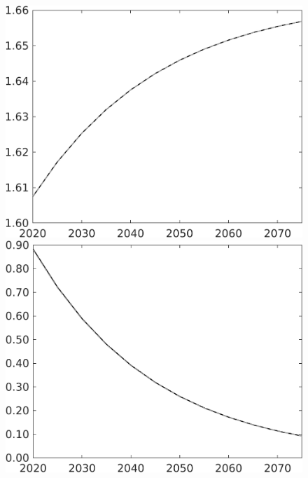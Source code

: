 \documentclass[12pt]{article}
\begin{document}
\begin{figure}[h!!]
\begin{minipage}[]{0.32\textwidth}
	\end{minipage}	
	\begin{minipage}[]{0.32\textwidth}
		\includegraphics[width=1\textwidth]{../../codding_model/own_basedOnFried/optimalPol_010922_revision/figures/all_13Sept22/CompTaul_Equlab_LFBAU_Reg0_pn_spillover0_nsk0_xgr1_knspil1_sep1_countec0_GovRev0_etaa0.79_lgd0.png}
	\end{minipage}	
	\begin{minipage}[]{0.32\textwidth}
		\includegraphics[width=1\textwidth]{../../codding_model/own_basedOnFried/optimalPol_010922_revision/figures/all_13Sept22/CompTaul_Equlab_LFBAU_Reg0_pg_spillover0_nsk0_xgr1_knspil1_sep1_countec0_GovRev0_etaa0.79_lgd0.png}

\end{minipage}
\end{figure}
\end{document}

